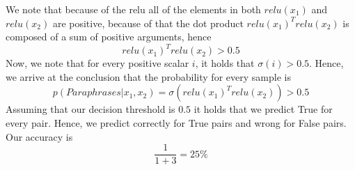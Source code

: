 We note that because of the relu all of the elements in both $relu(x_1)$ and $relu(x_2)$ are positive, 
because of that the dot product $relu(x_1)^T relu(x_2)$ is composed of a sum of positive arguments, hence 
$$relu(x_1)^T relu(x_2) > 0.5$$
Now, we note that for every positive scalar $i$, it holds that $\sigma (i) > 0.5$. Hence, we arrive at the conclusion that the probability for every sample is
$$p(Paraphrases|x_1, x_2) = \sigma (relu(x_1)^T relu(x_2)) > 0.5$$
Assuming that our decision threshold is $0.5$ it holds that we predict True for every pair.
Hence, we predict correctly for True pairs and wrong for False pairs. Our accuracy is 
$$\frac{1}{1+3}=25 \% $$